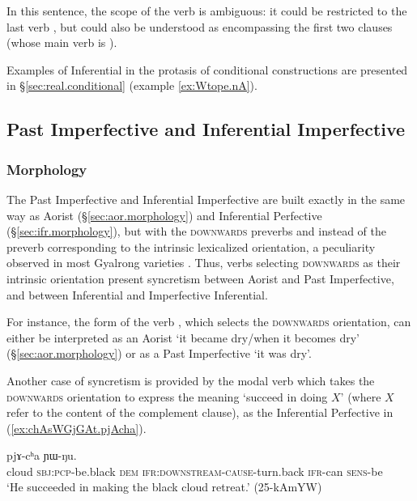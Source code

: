 In this sentence, the scope of the verb  is ambiguous: it could be restricted to the last verb , but could also be understood as encompassing the first two clauses (whose main verb is ).

Examples of Inferential in the protasis of conditional constructions are presented in §\ref{sec:real.conditional} (example \ref{ex:Wtope.nA}).

\subsection{Past Imperfective and Inferential Imperfective} \label{sec:pst.ifr.ipfv}
\subsubsection{Morphology} \label{sec:pst.ifr.ipfv.morphology}
The Past Imperfective and Inferential Imperfective are built exactly in the same way as Aorist (§\ref{sec:aor.morphology}) and Inferential Perfective (§\ref{sec:ifr.morphology}), but with the \textsc{downwards} preverbs  and  instead of the preverb corresponding to the intrinsic lexicalized orientation, a peculiarity observed in most Gyalrong varieties \citep{lin11direction}. Thus, verbs selecting \textsc{downwards} as their intrinsic orientation present syncretism between Aorist and Past Imperfective, and between Inferential and Imperfective Inferential.

For instance, the form  of the verb , which selects the \textsc{downwards} orientation, can either be interpreted as an Aorist `it became dry/when it becomes dry' (§\ref{sec:aor.morphology}) or as a Past Imperfective `it was dry'.

Another case of syncretism is provided by the modal verb  which takes the \textsc{downwards} orientation to express the meaning `succeed in doing $X$' (where $X$ refer to the content of the complement clause), as the Inferential Perfective  in (\ref{ex:chAsWGjGAt.pjAcha}).

\begin{exe}
\ex \label{ex:chAsWGjGAt.pjAcha}
 pjɤ-cʰa ɲɯ-ŋu. \\
cloud \textsc{sbj}:\textsc{pcp}-be.black \textsc{dem} \textsc{ifr}:\textsc{downstream}-\textsc{cause}-turn.back \textsc{ifr}-can \textsc{sens}-be \\
\glt `He succeeded in making the black cloud retreat.' (25-kAmYW)
\end{exe}

